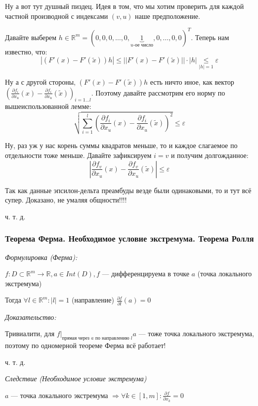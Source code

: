 \documentclass{article}
\begin{document}
Ну а вот тут душный пиздец. Идея в том, что мы хотим проверить для каждой частной производной с индексами $(v, u)$ наше предположение.

Давайте выберем $h \in \mathbb{R}^m = (0,0,0, \ldots, 0, \underbrace{1}_{u\text{-ое число}}, 0, \ldots, 0, 0)^T$.
Теперь нам известно, что:
\[|(F'(x) - F'(\widetilde{x}))h| \le ||F'(x) - F'(\widetilde{x})|| \cdot |h| \underset{|h| = 1}{\le} \varepsilon\]

Ну а с другой стороны, $(F'(x) - F'(\widetilde{x}))h$ есть ничто иное, как вектор $\left(\frac{\partial f_i}{\partial x_u}(x) - \frac{\partial f_i}{\partial x_u}(\widetilde{x})\right)_{i = 1 \ldots l}$. Поэтому давайте рассмотрим его норму по вышеиспользованной лемме:
\[\sqrt{\sum_{i = 1}^l{\left(\frac{\partial f_i}{\partial x_u}(x) - \frac{\partial f_i}{\partial x_u}(\widetilde{x})\right)^2}} \le \varepsilon\]

Ну, раз уж у нас корень суммы квадратов меньше, то и каждое слагаемое по отдельности тоже меньше. Давайте зафиксируем $i = v$ и получим долгожданное:
\[\left|\frac{\partial f_v}{\partial x_u}(x) - \frac{\partial f_v}{\partial x_u}(\widetilde{x})\right| \le \varepsilon\]

Так как данные эпсилон-дельта преамбуды везде были одинаковыми, то и тут всё супер. Доказано, не умаляя общности!!!!

ч. т. д.

\subsubsection{Теорема Ферма. Необходимое условие экстремума. Теорема Ролля}
\textit{Формулировка (Ферма):}

$f: D \subset \mathbb{R}^m \rightarrow \mathbb{R}, a \in Int(D), f$ --- дифференцируема в точке $a$ (точка локального экстремума)

Тогда $\forall l \in \mathbb{R}^m: |l| = 1$ (направление) $\frac{\partial f}{\partial l}(a) = 0$


\textit{Доказательство:}

Тривиалити, для $f|_{\text{прямая через }a\text{ по направлению }l} a$ --- тоже точка локального экстремума, поэтому по одномерной теореме Ферма всё работает!

ч. т. д.

\textit{Следствие (Необходимое условие экстремума)}

$a$ --- точка локального экстремума $\Rightarrow \forall k \in [1, m]: \frac{\partial f}{\partial x_k} = 0$
\end{document}
